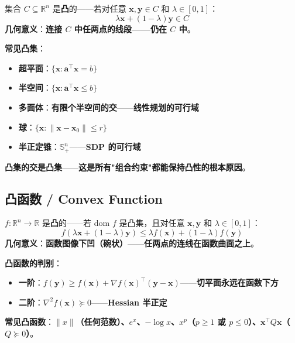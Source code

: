\begin{definition}[凸集]
集合 $C \subseteq \mathbb{R}^n$ 是\textbf{凸}的——若对任意 $\bm x, \bm y \in C$ 和 $\lambda \in [0,1]$：
\[
\lambda \bm x + (1-\lambda) \bm y \in C
\]
\textbf{几何意义}：\textbf{连接 $C$ 中任两点的线段——仍在 $C$ 中}。
\end{definition}

\textbf{常见凸集}：

\begin{itemize}
\item \textbf{超平面}：$\{\bm x : \bm a^\top \bm x = b\}$
\item \textbf{半空间}：$\{\bm x : \bm a^\top \bm x \le b\}$
\item \textbf{多面体}：\textbf{有限个半空间的交}——\textbf{线性规划的可行域}
\item \textbf{球}：$\{\bm x : \|\bm x - \bm x_0\| \le r\}$
\item \textbf{半正定锥}：$\mathbb{S}^n_+$——\textbf{SDP 的可行域}
\end{itemize}

\textbf{凸集的交是凸集}——\textbf{这是所有"组合约束"都能保持凸性的根本原因}。

\subsection{凸函数 / Convex Function}

\begin{definition}[凸函数]
$f: \mathbb{R}^n \to \mathbb{R}$ 是\textbf{凸}的——若 dom $f$ 是凸集，且对任意 $\bm x, \bm y$ 和 $\lambda \in [0,1]$：
\[
f(\lambda \bm x + (1-\lambda) \bm y) \le \lambda f(\bm x) + (1-\lambda) f(\bm y)
\]
\textbf{几何意义}：\textbf{函数图像\textbf{下凹}（碗状）}——\textbf{任两点的连线在函数曲面\textbf{之上}}。
\end{definition}

\textbf{凸函数的判别}：

\begin{itemize}
\item \textbf{一阶}：$f(\bm y) \ge f(\bm x) + \nabla f(\bm x)^\top (\bm y - \bm x)$——\textbf{切平面永远在函数下方}
\item \textbf{二阶}：$\nabla^2 f(\bm x) \succeq 0$——\textbf{Hessian 半正定}
\end{itemize}

\textbf{常见凸函数}：\textbf{$\|x\|$（任何范数）、$e^x$、$-\log x$、$x^p$（$p \ge 1$ 或 $p \le 0$）、$\bm x^\top Q \bm x$（$Q \succeq 0$）}。

